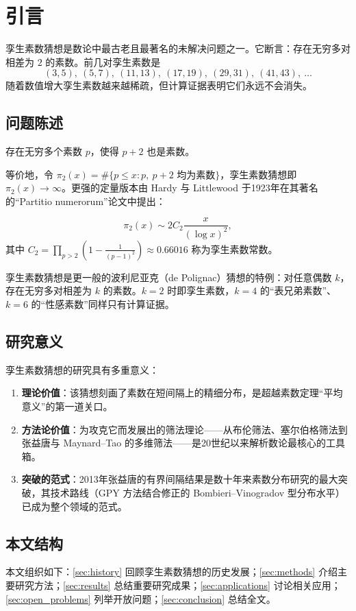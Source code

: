 \section{引言}\label{sec:introduction}

孪生素数猜想是数论中最古老且最著名的未解决问题之一。它断言：存在无穷多对相差为 $2$ 的素数。前几对孪生素数是
\begin{equation}
    (3,5),\ (5,7),\ (11,13),\ (17,19),\ (29,31),\ (41,43),\ \ldots
\end{equation}
随着数值增大孪生素数越来越稀疏，但计算证据表明它们永远不会消失。

\subsection{问题陈述}

\begin{definition}[孪生素数猜想]
    存在无穷多个素数 $p$，使得 $p+2$ 也是素数。
\end{definition}

等价地，令 $\pi_2(x) = \#\{p \le x : p,\ p+2 \text{ 均为素数}\}$，孪生素数猜想即 $\pi_2(x) \to \infty$。更强的定量版本由 Hardy 与 Littlewood 于1923年在其著名的“Partitio numerorum”论文中提出\cite{hardy1923some}：

\begin{conjecture}
    \begin{equation}
        \pi_2(x) \sim 2 C_2 \frac{x}{(\log x)^2},
    \end{equation}
    其中 $C_2 = \prod_{p > 2}\left(1 - \frac{1}{(p-1)^2}\right) \approx 0.66016$ 称为孪生素数常数。
\end{conjecture}

孪生素数猜想是更一般的波利尼亚克（de Polignac）猜想\cite{depolignac1849}的特例：对任意偶数 $k$，存在无穷多对相差为 $k$ 的素数。$k=2$ 时即孪生素数，$k=4$ 的“表兄弟素数”、$k=6$ 的“性感素数”同样只有计算证据。

\subsection{研究意义}

孪生素数猜想的研究具有多重意义：

\begin{enumerate}[label=(\arabic*)]
    \item \textbf{理论价值}：该猜想刻画了素数在短间隔上的精细分布，是超越素数定理“平均意义”的第一道关口。
    \item \textbf{方法论价值}：为攻克它而发展出的筛法理论——从布伦筛法、塞尔伯格筛法到张益唐与 Maynard--Tao 的多维筛法——是20世纪以来解析数论最核心的工具箱。
    \item \textbf{突破的范式}：2013年张益唐的有界间隔结果\cite{zhang2014bounded}是数十年来素数分布研究的最大突破，其技术路线（GPY 方法结合修正的 Bombieri--Vinogradov 型分布水平）已成为整个领域的范式。
\end{enumerate}

\subsection{本文结构}

本文组织如下：\cref{sec:history} 回顾孪生素数猜想的历史发展；\cref{sec:methods} 介绍主要研究方法；\cref{sec:results} 总结重要研究成果；\cref{sec:applications} 讨论相关应用；\cref{sec:open_problems} 列举开放问题；\cref{sec:conclusion} 总结全文。
